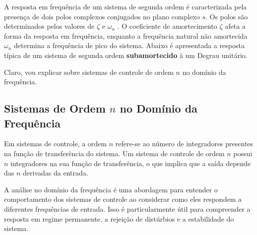 \documentclass[a4paper,12pt]{article}
\begin{document}
    A resposta em frequência de um sistema de segunda ordem é caracterizada pela presença de dois polos complexos conjugados no plano complexo $s$. Os polos são determinados pelos valores de $\zeta$ e  $\omega_n$ . O coeficiente de amortecimento $\zeta$ afeta a forma da resposta em frequência, enquanto a frequência natural não amortecida $\omega_n$ determina a frequência de pico do sistema. Abaixo é apresentada a resposta típica de um sistema de segunda ordem \textbf{subamortecido} à um Degrau unitário.


    Claro, vou explicar sobre sistemas de controle de ordem \(n\) no domínio da frequência.

\subsection{Sistemas de Ordem \(n\) no Domínio da Frequência}

Em sistemas de controle, a ordem \(n\) refere-se ao número de integradores presentes na função de transferência do sistema. Um sistema de controle de ordem \(n\) possui \(n\) integradores na sua função de transferência, o que implica que a saída depende das \(n\) derivadas da entrada.

A análise no domínio da frequência é uma abordagem para entender o comportamento dos sistemas de controle ao considerar como eles respondem a diferentes frequências de entrada. Isso é particularmente útil para compreender a resposta em regime permanente, a rejeição de distúrbios e a estabilidade do sistema.
\end{document}
